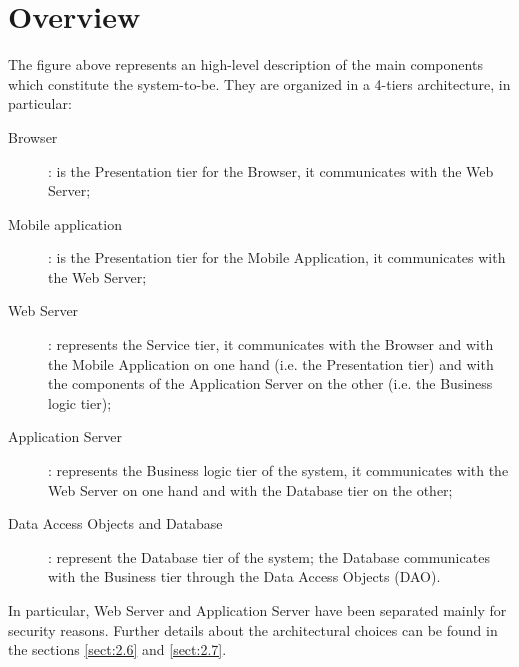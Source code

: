 \documentclass[../../DD.tex]{subfiles}
\begin{document}
\section{Overview\label{sect:2.1}}


The figure above represents an high-level description of the main components which constitute the system-to-be. They are organized in a 4-tiers architecture, in particular:
\begin{description}
	\item [Browser]: is the Presentation tier for the  Browser, it communicates with the Web Server;
	\item [Mobile application]: is the Presentation tier for the  Mobile Application, it communicates with the Web Server;
	\item [Web Server]: represents the Service tier, it communicates with the  Browser and with the Mobile Application on one hand (i.e. the Presentation tier) and with the components of the Application Server on the other (i.e. the Business logic tier);
	\item [Application Server]: represents the Business logic tier of the system, it communicates with the Web Server on one hand and with the Database tier on the other; 
	\item [Data Access Objects and Database]: represent the Database tier of the system; the Database communicates with the Business tier through the Data Access Objects (DAO).
\end{description}
In particular, Web Server and Application Server have been separated mainly for security reasons.
Further details about the architectural choices can be found in the sections \ref{sect:2.6} and \ref{sect:2.7}.
\newpage
\end{document}
